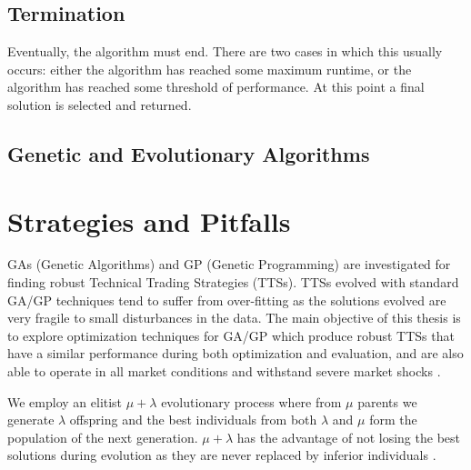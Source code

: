 \subsection{Termination}
Eventually, the algorithm must end. There are two cases in which this usually occurs: either the algorithm has reached some maximum runtime, or the algorithm has reached some threshold of performance. At this point a final solution is selected and returned.

\subsection{Genetic and Evolutionary Algorithms}









\section{Strategies and Pitfalls}

GAs (Genetic Algorithms) and GP (Genetic Programming) are investigated
for finding robust Technical Trading Strategies (TTSs). TTSs evolved with
standard GA/GP techniques tend to suffer from over-fitting as the solutions
evolved are very fragile to small disturbances in the data. The main objective
of this thesis is to explore optimization techniques for GA/GP which
produce robust TTSs that have a similar performance during both optimization
and evaluation, and are also able to operate in all market conditions
and withstand severe market shocks \cite{Lindquist2017}.




We employ an elitist $\mu + \lambda$ evolutionary process where from $\mu$ parents we
generate $\lambda$ offspring and the best individuals from both $\lambda$ and $\mu$ form the
population of the next generation.  $\mu + \lambda$ has the advantage of not losing
the best solutions during evolution as they are never replaced by inferior
individuals \cite{Lindquist2017}.


